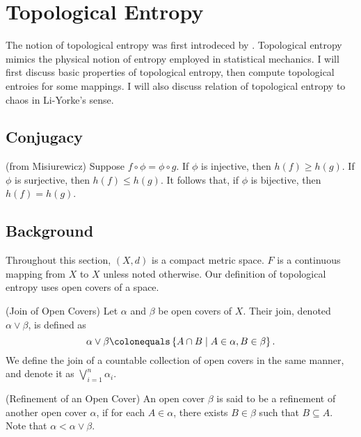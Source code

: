 \documentclass[12pt,twoside,draft]{book}
\begin{document}
\chapter{Topological Entropy}
The notion of topological entropy was first introdeced by \citet{akm}.
Topological entropy mimics the physical notion of entropy employed in statistical mechanics.
I will first discuss basic properties of topological entropy, then compute topological entroies for some mappings.
I will also discuss relation of topological entropy to chaos in Li-Yorke's sense.

\section{Conjugacy}
(from Misiurewicz)
Suppose $f\circ \phi = \phi \circ g$.
If $\phi$ is injective, then $h(f) \geq h(g)$.
If $\phi$ is surjective, then $h(f) \leq h(g)$.
It follows that, if $\phi$ is bijective, then $h(f) = h(g)$.

\section{Background}
Throughout this section, $(X,d)$ is a compact metric space.
$F$ is a continuous mapping from $X$ to $X$ unless noted otherwise.
Our definition of topological entropy uses open covers of a space. 

\begin{definition}
  (Join of Open Covers)
  Let $\alpha$ and $\beta$ be open covers of $X$.
  Their join, denoted $\alpha \vee \beta$, is defined as
  \begin{equation*}
    \alpha \vee \beta \ceq \setst{A \cap B}{A \in \alpha, B \in \beta}.
  \end{equation*}
  We define the join of a countable collection of open covers in the same manner, and denote it as $\bigvee\limits_{i = 1}^{n} \alpha_i$.
\end{definition}

\begin{definition}
  (Refinement of an Open Cover)
  An open cover $\beta$ is said to be a refinement of another open cover $\alpha$, if for each $A \in \alpha$, there exists $B \in \beta$ such that $B \subseteq A$.
  Note that $\alpha < \alpha \vee \beta$.
\end{definition}
\end{document}
